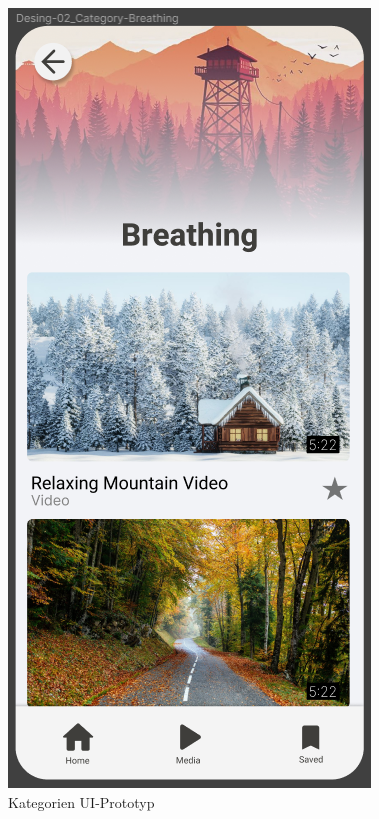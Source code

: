 \begin{figure}[H]
    \begin{minipage}{0.5\textwidth}
        \centering
        \includegraphics[height=2\textwidth]{./pics/pKategorie.png}
        \caption{Kategorien UI-Prototyp}

\end{minipage}
\end{figure}
